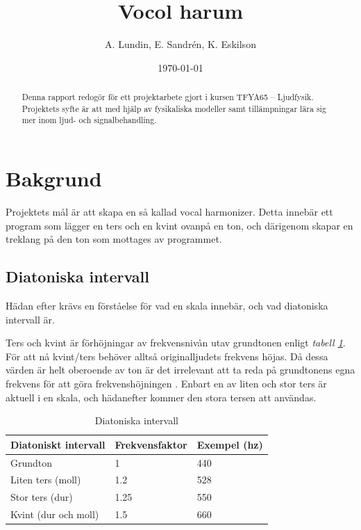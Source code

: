 \documentclass[12pt,a4paper]{article}
\begin{document}
\title{Vocol harum}
\author{A. Lundin, E. Sandrén, K. Eskilson}
\date{\today}



\newpage\null\thispagestyle{empty}\newpage

\newpage{}%

\renewcommand{\abstractname}{Sammanfattning}
\begin{abstract}
  Denna rapport redogör för ett projektarbete gjort i kursen TFYA65 – Ljudfysik. Projektets syfte är att med hjälp av fysikaliska modeller samt tillämpningar lära sig mer inom ljud- och signalbehandling.
\end{abstract}

\newpage

\tableofcontents

\newpage

\section{Bakgrund}

Projektets mål är att skapa en så kallad vocal harmonizer. Detta innebär ett program som lägger en ters och en kvint ovanpå en ton, och därigenom skapar en treklang på den ton som mottages av programmet.

\subsection{Diatoniska intervall}

Hädan efter krävs en förståelse för vad en skala innebär, och vad diatoniska intervall är.

Ters och kvint är förhöjningar av frekvensnivån utav grundtonen enligt \emph{tabell \ref{table:diatonic}}. För att nå kvint/ters behöver alltså originalljudets frekvens höjas. Då dessa värden är helt oberoende av ton är det irrelevant att ta reda på grundtonens egna frekvens för att göra frekvenshöjningen \cite{bib:schmidt}. Enbart en av liten och stor ters är aktuell i en skala, och hädanefter kommer den stora tersen att användas. \\

\begin{table}[h]
  \begin{center}
    \begin{tabular}{l l l}
      Diatoniskt intervall & Frekvensfaktor & Exempel (hz) \\
      \hline
      Grundton & 1 & 440 \\
      Liten ters (moll) & 1.2 & 528 \\
      Stor ters (dur) & 1.25 & 550 \\
      Kvint (dur och moll) & 1.5 & 660 \\
    \end{tabular}
    \caption[Table caption text]{Diatoniska intervall}
    \label{table:diatonic}
  \end{center}
\end{table}
\end{document}
